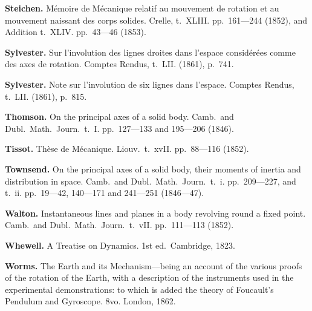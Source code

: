\documentclass[11pt,a4paper]{book}
\begin{document}
\vspace{0.5em}

\noindent\textbf{Steichen.} M\'{e}moire de M\'{e}canique relatif au mouvement de rotation et au mouvement naissant des corps solides. Crelle, t.~XLIII. pp.~161---244 (1852), and Addition t.~XLIV. pp.~43---46 (1853).

\vspace{0.5em}

\noindent\textbf{Sylvester.} Sur l'involution des lignes droites dans l'espace consid\'{e}r\'{e}es comme des axes de rotation. Comptes Rendus, t.~LII. (1861), p.~741.

\vspace{0.5em}

\noindent\textbf{Sylvester.} Note sur l'involution de six lignes dans l'espace. Comptes Rendus, t.~LII. (1861), p.~815.

\vspace{0.5em}

\noindent\textbf{Thomson.} On the principal axes of a solid body. Camb.~and Dubl.~Math.~Journ.~t.~I. pp.~127---133 and 195---206 (1846).

\vspace{0.5em}

\noindent\textbf{Tissot.} Th\`{e}se de M\'{e}canique. Liouv.~t.~xvII. pp.~88---116 (1852).

\vspace{0.5em}

\noindent\textbf{Townsend.} On the principal axes of a solid body, their moments of inertia and distribution in space. Camb.~and Dubl.~Math.~Journ.~t.~i. pp.~209---227, and t.~ii. pp.~19---42, 140---171 and 241---251 (1846---47).

\vspace{0.5em}

\noindent\textbf{Walton.} Instantaneous lines and planes in a body revolving round a fixed point. Camb.~and Dubl.~Math.~Journ.~t.~vII. pp.~111---113 (1852).

\vspace{0.5em}

\noindent\textbf{Whewell.} A Treatise on Dynamics. 1st ed.~Cambridge, 1823.

\vspace{0.5em}

\noindent\textbf{Worms.} The Earth and its Mechanism---being an account of the various proofs of the rotation of the Earth, with a description of the instruments used in the experimental demonstrations: to which is added the theory of Foucault's Pendulum and Gyroscope. 8vo. London, 1862.
\end{document}
